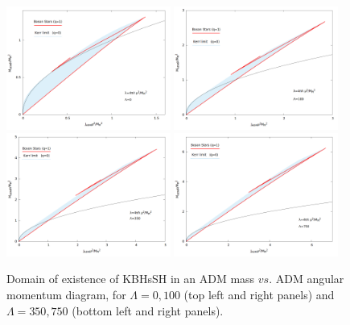 \begin{figure}[h!]
  \begin{center}
    \includegraphics[width=0.48\textwidth]{papers/selfInteractions/c2=0-J-M.png}
    \includegraphics[width=0.48\textwidth]{papers/selfInteractions/c2=100-J-M.png}\\
    \includegraphics[width=0.48\textwidth]{papers/selfInteractions/c2=350-J-M.png}
    \includegraphics[width=0.48\textwidth]{papers/selfInteractions/c2=750-J-M.png}
  \end{center}
  \caption{Domain of existence of KBHsSH in an ADM mass $vs.$ ADM angular momentum diagram, for $\Lambda=0,100$ (top left and right panels) and $\Lambda=350,750$ (bottom left and right panels).}
  \label{fig:no-HBHs}
\end{figure}
 

